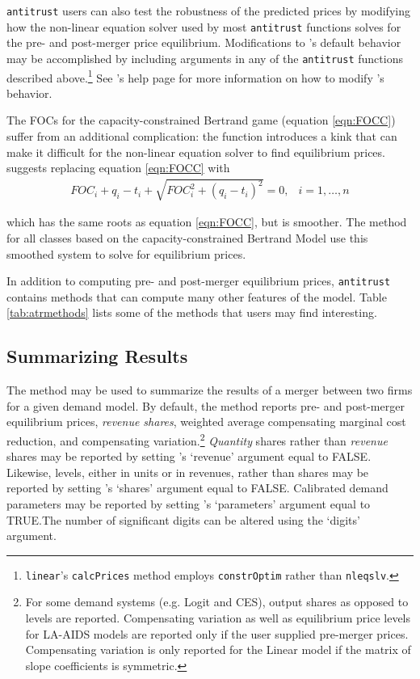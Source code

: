 \documentclass[11pt,numbers=noenddot,pointlessnumbers]{scrreprt}
\newcommand{\atr}{{\tt antitrust}}
\numberwithin{equation}{section}
\begin{document}
\atr{} users can also test the robustness of the predicted prices by
modifying how  the non-linear equation solver \verb@nleqslv@ used by
most \atr{} functions solves for the pre- and post-merger price equilibrium.
Modifications to \verb@nleqslv@'s default
behavior may be accomplished by including \verb@nleqslv@
arguments in any of the \atr{} functions described
above.\footnote{\texttt{linear}'s \texttt{calcPrices} method employs
  \texttt{constrOptim} rather than \texttt{nleqslv}.} See
\verb@nleqslv@'s help page for more information on how to
modify \verb@nleqslv@'s behavior.

The FOCs for the capacity-constrained Bertrand game (equation
\ref{eqn:FOCC}) suffer from an additional complication: the \verb@max@
function introduces a kink that can make it difficult for the
non-linear equation solver to find equilibrium
prices. \citet[p.~54]{Froeb2003} suggests replacing  equation
\ref{eqn:FOCC} with
\begin{align*}
 FOC_i +  q_i - t_i + \sqrt{FOC_i^2 + (q_i - t_i)^2}=0,& i=1,\ldots,n
\end{align*}

which has the same roots as equation \ref{eqn:FOCC}, but is
smoother. The \verb@calcPrices@ method for all classes based on the
capacity-constrained Bertrand Model use this smoothed system to solve
for equilibrium prices.

In addition to computing pre- and post-merger equilibrium prices,
\atr{} contains methods that can compute many other features of the
model. Table \ref{tab:atrmethods} lists some of the methods that users
may find interesting.

\subsection{Summarizing Results}
The \verb@summary@ method may be used to summarize the results of a
merger between two firms for a given demand model. By default, the \verb@summary@ method
reports pre- and post-merger equilibrium prices, \emph{revenue shares}, weighted average compensating marginal cost reduction, and
compensating variation.\footnote{For some demand systems (e.g. Logit
  and CES), output shares as opposed to levels are
  reported. Compensating variation as well as equilibrium price levels
  for LA-AIDS models are reported only
  if the user supplied pre-merger prices. Compensating variation is
  only reported for the Linear model if the matrix of slope
  coefficients is symmetric.} \emph{Quantity} shares rather than
\emph{revenue} shares may be reported by setting \verb@summary@'s
`revenue' argument equal to
 FALSE. Likewise, levels, either in units or in revenues, rather than shares may
 be reported by setting  \verb@summary@'s
`shares' argument equal to FALSE. Calibrated demand parameters may be reported by setting
\verb@summary@'s `parameters' argument equal to TRUE.The number of significant digits can be
altered using the `digits' argument.
\end{document}
